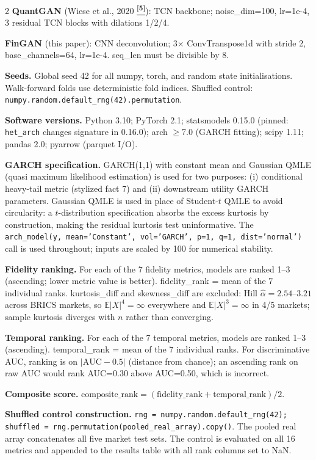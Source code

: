 \documentclass[10pt]{article}
\newcommand{\tcite}[1]{%
  \hyperlink{R:#1}{\textsuperscript{\scriptsize\textbf{[#1]}}}}
\newcommand{\E}{\mathbb{E}}
\begin{document}
\begin{multicols}{2}
\textbf{QuantGAN} (Wiese et al., 2020\tcite{5}): TCN backbone; noise\_dim=100, lr=1e-4, 3 residual TCN blocks with dilations 1/2/4.

\textbf{FinGAN} (this paper): CNN deconvolution; 3$\times$ ConvTranspose1d with stride 2, base\_channels=64, lr=1e-4. seq\_len must be divisible by 8.

\columnbreak

\textbf{Seeds.}
Global seed 42 for all numpy, torch, and random state initialisations. Walk-forward folds use deterministic fold indices. Shuffled control: \texttt{numpy.random.default\_rng(42).permutation}.

\textbf{Software versions.}
Python 3.10; PyTorch 2.1; statsmodels 0.15.0 (pinned: \texttt{het\_arch} changes signature in 0.16.0); arch $\geq$7.0 (GARCH fitting); scipy 1.11; pandas 2.0; pyarrow (parquet I/O).

\textbf{GARCH specification.}
GARCH(1,1) with constant mean and Gaussian QMLE (quasi maximum likelihood estimation) is used for two purposes: (i) conditional heavy-tail metric (stylized fact 7) and (ii) downstream utility GARCH parameters. Gaussian QMLE is used in place of Student-$t$ QMLE to avoid circularity: a $t$-distribution specification absorbs the excess kurtosis by construction, making the residual kurtosis test uninformative. The \texttt{arch\_model(y, mean='Constant', vol='GARCH', p=1, q=1, dist='normal')} call is used throughout; inputs are scaled by 100 for numerical stability.

\textbf{Fidelity ranking.}
For each of the 7 fidelity metrics, models are ranked 1--3 (ascending; lower metric value is better). fidelity\_rank = mean of the 7 individual ranks. kurtosis\_diff and skewness\_diff are excluded: Hill $\hat{\alpha}=2.54$--$3.21$ across BRICS markets, so $\E|X|^4=\infty$ everywhere and $\E|X|^3=\infty$ in 4/5 markets; sample kurtosis diverges with $n$ rather than converging.

\textbf{Temporal ranking.}
For each of the 7 temporal metrics, models are ranked 1--3 (ascending). temporal\_rank = mean of the 7 individual ranks. For discriminative AUC, ranking is on $|\text{AUC} - 0.5|$ (distance from chance); an ascending rank on raw AUC would rank AUC=0.30 above AUC=0.50, which is incorrect.

\textbf{Composite score.}
$\text{composite\_rank} = (\text{fidelity\_rank} + \text{temporal\_rank}) / 2$.

\textbf{Shuffled control construction.}
\texttt{rng = numpy.random.default\_rng(42); shuffled = rng.permutation(pooled\_real\_array).copy()}. The pooled real array concatenates all five market test sets. The control is evaluated on all 16 metrics and appended to the results table with all rank columns set to NaN.


\end{multicols}
\end{document}
